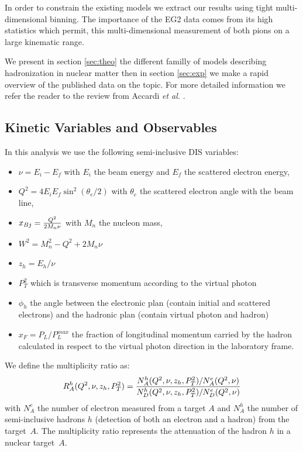 In order to constrain the existing models we extract our results
using tight multi-dimensional binning. 
The importance of the EG2 data comes from its high statistics which permit, 
this multi-dimensional measurement of both pions on a 
large kinematic range.

We present in section \ref{sec:theo} the different familly of models describing
hadronization in nuclear matter then in section \ref{sec:exp} we make a rapid
overview of the published data on the topic. For more detailed information we 
refer the reader to the review from Accardi {\it et al.} \cite{Accardi:2009qv}.


\subsection{Kinetic Variables and Observables}

In this analysis we use the following semi-inclusive DIS variables:
\begin{itemize}
 \item $\nu = E_i - E_f$ with $E_i$ the beam energy and $E_f$ the scattered electron energy,
 \item $Q^2 = 4 E_i E_f \sin ^2(\theta_e / 2)$ with $\theta_e$ the scattered electron angle with the beam line,
 \item $x_{Bj} = {{Q^2} \over {2 M_n \nu}}$ with $M_n$ the nucleon mass,
 \item $W^2 = M_n^2 - Q^2 + 2 M_n \nu$
 \item $z_h = E_h / \nu$
 \item $P_T^2$ which is transverse momentum according to the virtual photon
 \item $\phi_h$ the angle between the electronic plan (contain initial and scattered electrons) and the hadronic plan (contain virtual photon and hadron)
 \item $x_F = P_L/P_L^{max}$ the fraction of longitudinal momentum carried by the hadron calculated in respect to the virtual photon direction in the laboratory frame.
\end{itemize}

We define the multiplicity ratio as:
\begin{equation}
R_A^h (Q^2,\nu,z_h,P_T^2) = {{N_A^h (Q^2,\nu,z_h,P_T^2) / N_A^e (Q^2,\nu)} 
                       \over {N_D^h (Q^2,\nu,z_h,P_T^2) / N_D^e (Q^2,\nu)}}
\end{equation}
with $N^e_A$ the number of electron measured from a target $A$ and $N_A^h$ the number
of semi-inclusive hadrons $h$ (detection of both an electron and a hadron) from the
target~$A$. The multiplicity ratio represents the attenuation of the hadron $h$ in a 
nuclear target~$A$.
\newline

